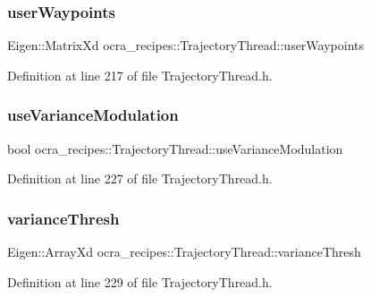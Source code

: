 \subsubsection{\texorpdfstring{user\+Waypoints}{userWaypoints}}
{\footnotesize\ttfamily Eigen\+::\+Matrix\+Xd ocra\+\_\+recipes\+::\+Trajectory\+Thread\+::user\+Waypoints\hspace{0.3cm}{\ttfamily [protected]}}



Definition at line 217 of file Trajectory\+Thread.\+h.

\hypertarget{classocra__recipes_1_1TrajectoryThread_a963041d784e1078db6a3095a0438a129}{}\label{classocra__recipes_1_1TrajectoryThread_a963041d784e1078db6a3095a0438a129} 
\subsubsection{\texorpdfstring{use\+Variance\+Modulation}{useVarianceModulation}}
{\footnotesize\ttfamily bool ocra\+\_\+recipes\+::\+Trajectory\+Thread\+::use\+Variance\+Modulation\hspace{0.3cm}{\ttfamily [protected]}}



Definition at line 227 of file Trajectory\+Thread.\+h.

\hypertarget{classocra__recipes_1_1TrajectoryThread_a63dbf38d082f3ebcebaee867dba2a8ee}{}\label{classocra__recipes_1_1TrajectoryThread_a63dbf38d082f3ebcebaee867dba2a8ee} 
\subsubsection{\texorpdfstring{variance\+Thresh}{varianceThresh}}
{\footnotesize\ttfamily Eigen\+::\+Array\+Xd ocra\+\_\+recipes\+::\+Trajectory\+Thread\+::variance\+Thresh\hspace{0.3cm}{\ttfamily [protected]}}



Definition at line 229 of file Trajectory\+Thread.\+h.


